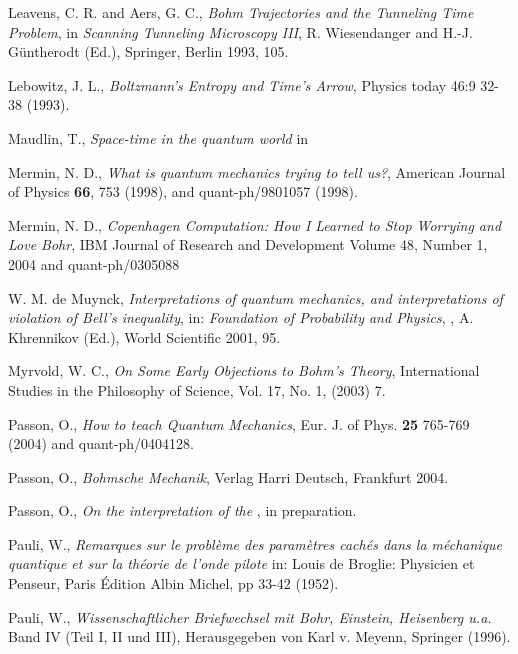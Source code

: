 \begin{thebibliography}{10}
 Leavens, C. R. and Aers, G. C., {\em Bohm Trajectories and the Tunneling Time 
  Problem}, in {\em Scanning Tunneling Microscopy III}, R. Wiesendanger and 
  H.-J. G\"untherodt (Ed.), Springer, Berlin 1993, 105.  

 Lebowitz, J. L., {\em Boltzmann's Entropy and Time's Arrow}, Physics today 46:9 32-38 (1993).

 Maudlin, T., {\em Space-time in the quantum world} in \cite{appraisal}

 Mermin, N. D., {\em What is quantum mechanics trying to 
tell us?}, American Journal of Physics {\bf 66}, 753 (1998), and
quant-ph/9801057 (1998).  

 Mermin, N. D., {\em Copenhagen Computation: How I Learned to Stop Worrying and Love Bohr}, IBM Journal of Research 
  and Development Volume 48, Number 1, 2004 and quant-ph/0305088 


 W. M. de Muynck, {\em Interpretations of quantum mechanics,
    and interpretations of violation of Bell's inequality}, in: {\em
    Foundation of Probability  and Physics}, , A. Khrennikov (Ed.), 
     World Scientific 2001, 95. 


 Myrvold, W. C., {\em On Some Early Objections to Bohm's Theory}, 
International Studies in the Philosophy of Science, Vol. 17, No. 1, (2003) 7. 


 Passon, O., {\em How to teach Quantum Mechanics}, Eur. J. of Phys. {\bf 25} 765-769 (2004) and quant-ph/0404128.

 Passon, O., {\em Bohmsche Mechanik}, Verlag Harri Deutsch, Frankfurt 2004.

 Passon, O., {\em On the interpretation of the \dbb}, in preparation.

 Pauli, W., {\em  Remarques sur le probl\`eme des param\`etres cach\'es dans la m\'echanique quantique et sur 
la th\'eorie   de l'onde pilote} in: Louis de Broglie: Physicien et Penseur, Paris \'Edition Albin Michel, pp 33-42 (1952).   

 Pauli, W., {\em Wissenschaftlicher Briefwechsel mit
 Bohr, Einstein, Heisenberg u.a.} Band IV (Teil I, II und III),
 Herausgegeben von Karl v. Meyenn, Springer (1996).


\end{thebibliography}
